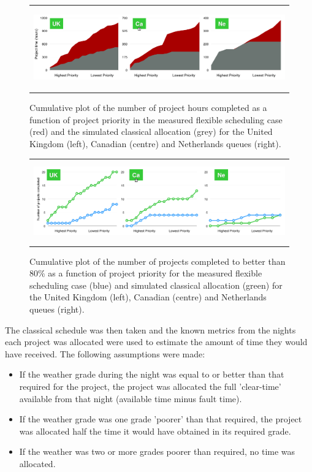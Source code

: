 \documentclass[]{spie}  %
\begin{document}
\begin{figure}[ht]
   \begin{center}
   \begin{tabular}{c}
   \includegraphics[height=3.5cm]{projecthours_cumul_2007.png}
   \end{tabular}
   \end{center}
   \caption{\label{fig:cvf_hours} Cumulative plot of the number of project hours completed as a function of project priority in the measured flexible scheduling case (red) and the simulated classical allocation (grey) for the United Kingdom (left), Canadian (centre) and Netherlands queues (right).  }

\end{figure}
\begin{figure}
   \begin{center}
   \begin{tabular}{c}
   \includegraphics[height=3.5cm]{numprojcomp_cumul_2007.png}
   \end{tabular}
   \end{center}
   \caption{\label{fig:cvf_proj} Cumulative plot of the number of projects completed to better than 80$\%$ as a function of project priority for the measured flexible scheduling case (blue) and simulated classical allocation (green) for the  United Kingdom (left), Canadian (centre) and Netherlands queues (right).}
\end{figure}

The classical schedule was then taken and the known metrics from the
nights each project was allocated were used to estimate the amount of
time they would have received. The following assumptions were made:
\begin{itemize}
\item If the weather grade during the night was equal to or better
  than that required for the project, the project was allocated the
  full 'clear-time' available from that night (available time minus
  fault time).
\item If the weather grade was one grade 'poorer' than that required,
  the project was allocated half the time it would have obtained in
  its required grade.
\item If the weather was two or more grades poorer than required, no
  time was allocated.
\end{itemize}
\end{document}
